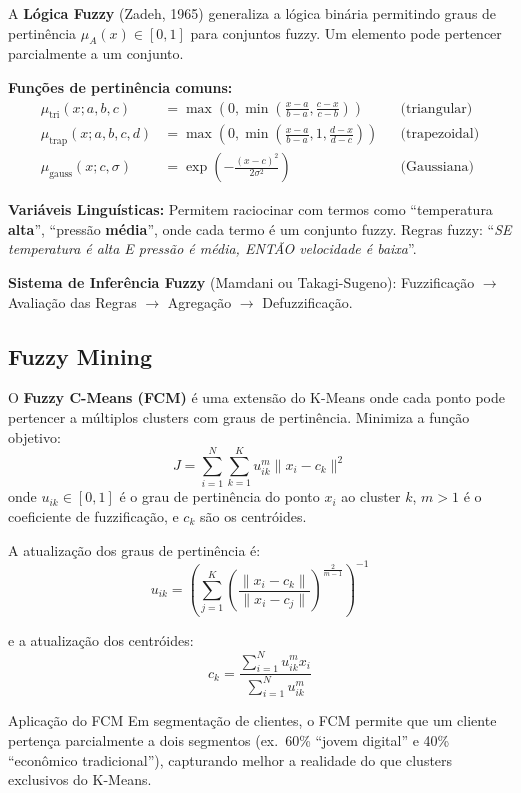 \documentclass[12pt,a4paper]{article}
\begin{document}
A \textbf{Lógica Fuzzy} (Zadeh, 1965) generaliza a lógica binária permitindo graus de pertinência $\mu_A(x) \in [0,1]$ para conjuntos fuzzy. Um elemento pode pertencer parcialmente a um conjunto.

\textbf{Funções de pertinência comuns:}
\begin{align}
  \mu_{\text{tri}}(x; a,b,c) &= \max\!\left(0, \min\!\left(\frac{x-a}{b-a}, \frac{c-x}{c-b}\right)\right) && \text{(triangular)}\\
  \mu_{\text{trap}}(x; a,b,c,d) &= \max\!\left(0, \min\!\left(\frac{x-a}{b-a}, 1, \frac{d-x}{d-c}\right)\right) && \text{(trapezoidal)}\\
  \mu_{\text{gauss}}(x; c,\sigma) &= \exp\!\left(-\frac{(x-c)^2}{2\sigma^2}\right) && \text{(Gaussiana)}
\end{align}

\textbf{Variáveis Linguísticas:} Permitem raciocinar com termos como ``temperatura \textbf{alta}'', ``pressão \textbf{média}'', onde cada termo é um conjunto fuzzy. Regras fuzzy: ``\textit{SE temperatura é alta E pressão é média, ENTÃO velocidade é baixa}''.

\textbf{Sistema de Inferência Fuzzy} (Mamdani ou Takagi-Sugeno): Fuzzificação $\to$ Avaliação das Regras $\to$ Agregação $\to$ Defuzzificação.

\subsection{Fuzzy Mining}

O \textbf{Fuzzy C-Means (FCM)} é uma extensão do K-Means onde cada ponto pode pertencer a múltiplos clusters com graus de pertinência. Minimiza a função objetivo:
\[
  J = \sum_{i=1}^{N} \sum_{k=1}^{K} u_{ik}^m \|x_i - c_k\|^2
\]
onde $u_{ik} \in [0,1]$ é o grau de pertinência do ponto $x_i$ ao cluster $k$, $m > 1$ é o coeficiente de fuzzificação, e $c_k$ são os centróides.

A atualização dos graus de pertinência é:
\[
  u_{ik} = \left(\sum_{j=1}^{K} \left(\frac{\|x_i - c_k\|}{\|x_i - c_j\|}\right)^{\frac{2}{m-1}}\right)^{-1}
\]

e a atualização dos centróides:
\[
  c_k = \frac{\sum_{i=1}^{N} u_{ik}^m x_i}{\sum_{i=1}^{N} u_{ik}^m}
\]

\begin{exemplobox}{Aplicação do FCM}
Em segmentação de clientes, o FCM permite que um cliente pertença parcialmente a dois segmentos (ex.\ 60\% ``jovem digital'' e 40\% ``econômico tradicional''), capturando melhor a realidade do que clusters exclusivos do K-Means.
\end{exemplobox}
\end{document}
